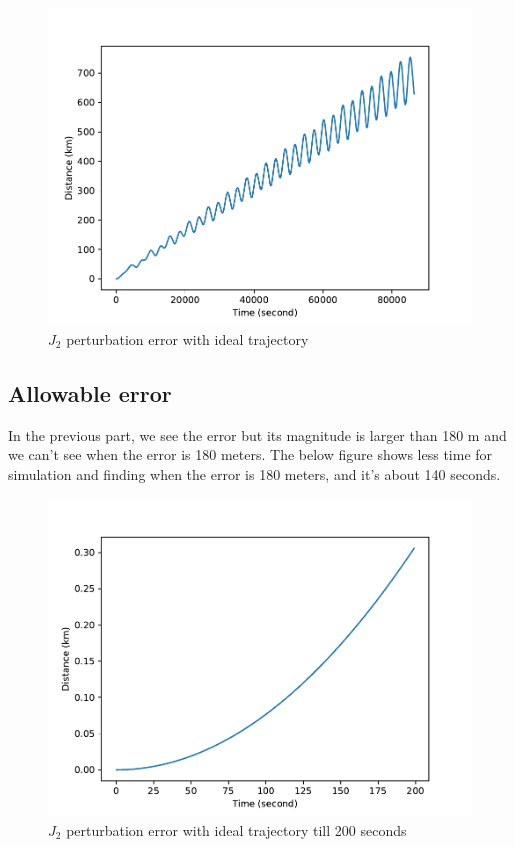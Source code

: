 \begin{figure}[H]
    \centering
    \includegraphics[width=1\textwidth]{../Figure/Q3/ISS_trajectory_error_all}
    \caption{$J_2$ perturbation error with ideal trajectory}
\end{figure}


\subsection{Allowable error}
In the previous part, we see the error but its magnitude is larger than 180 m and we can't see when the error is 180 meters. The below figure shows less time for simulation and finding when the error is 180 meters, and it's about 140 seconds.

\begin{figure}[H]
    \centering
    \includegraphics[width=1\textwidth]{../Figure/Q3/ISS_trajectory_error_min}
    \caption{$J_2$ perturbation error with ideal trajectory till 200 seconds}
\end{figure}